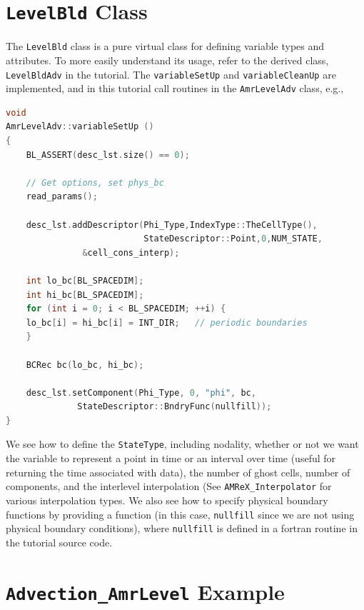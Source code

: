 \section{{\tt LevelBld} Class}
The {\tt LevelBld} class is a pure virtual class for defining variable types
and attributes.  To more easily understand its usage, refer to the derived class,
{\tt LevelBldAdv} in the tutorial.  The {\tt variableSetUp} and {\tt variableCleanUp} are implemented,
and in this tutorial call routines in the {\tt AmrLevelAdv} class, e.g.,
\begin{lstlisting}[language=cpp]
void
AmrLevelAdv::variableSetUp ()
{
    BL_ASSERT(desc_lst.size() == 0);

    // Get options, set phys_bc
    read_params();

    desc_lst.addDescriptor(Phi_Type,IndexType::TheCellType(),
                           StateDescriptor::Point,0,NUM_STATE,
			   &cell_cons_interp);

    int lo_bc[BL_SPACEDIM];
    int hi_bc[BL_SPACEDIM];
    for (int i = 0; i < BL_SPACEDIM; ++i) {
	lo_bc[i] = hi_bc[i] = INT_DIR;   // periodic boundaries
    }
    
    BCRec bc(lo_bc, hi_bc);

    desc_lst.setComponent(Phi_Type, 0, "phi", bc, 
			  StateDescriptor::BndryFunc(nullfill));
}
\end{lstlisting}
We see how to define the {\tt StateType}, including nodality, whether or not we want
the variable to represent a point in time or an interval over time (useful for returning
the time associated with data), the number of ghost cells, number of components,
and the interlevel interpolation (See {\tt AMReX\_Interpolator} for various interpolation
types.  We also see how to specify physical boundary functions by providing a function (in this case,
{\tt nullfill} since we are not using physical boundary conditions), where {\tt nullfill} is
defined in a fortran routine in the tutorial source code.

\section{{\tt Advection\_AmrLevel} Example}

